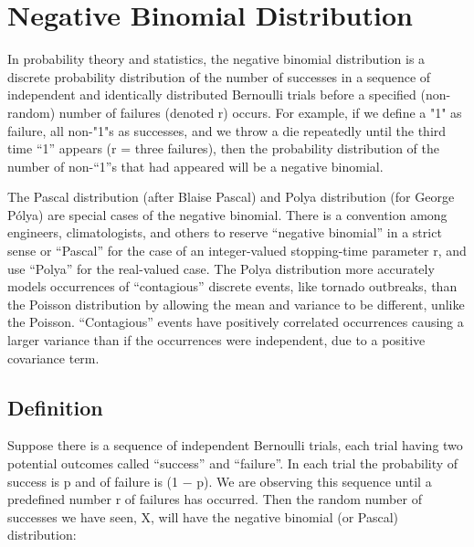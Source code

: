 \section*{Negative Binomial Distribution}

In probability theory and statistics, the negative binomial distribution is a discrete probability distribution of the number of successes in a sequence of independent and identically distributed Bernoulli trials before a specified (non-random) number of failures (denoted r) occurs. For example, if we define a "1" as failure, all non-"1"s as successes, and we throw a die repeatedly until the third time “1” appears (r = three failures), then the probability distribution of the number of non-“1”s that had appeared will be a negative binomial.
 
The Pascal distribution (after Blaise Pascal) and Polya distribution (for George Pólya) are special cases of the negative binomial. There is a convention among engineers, climatologists, and others to reserve “negative binomial” in a strict sense or “Pascal” for the case of an integer-valued stopping-time parameter r, and use “Polya” for the real-valued case. The Polya distribution more accurately models occurrences of “contagious” discrete events, like tornado outbreaks, than the Poisson distribution by allowing the mean and variance to be different, unlike the Poisson. “Contagious” events have positively correlated occurrences causing a larger variance than if the occurrences were independent, due to a positive covariance term.


\subsection*{Definition}
 
Suppose there is a sequence of independent Bernoulli trials, each trial having two potential outcomes called “success” and “failure”. In each trial the probability of success is p and of failure is (1 − p). We are observing this sequence until a predefined number r of failures has occurred. Then the random number of successes we have seen, X, will have the negative binomial (or Pascal) distribution:
 
